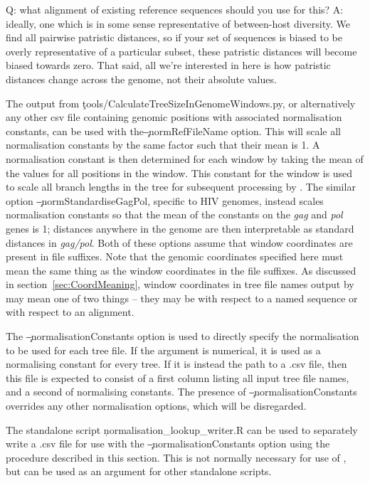 Q: what alignment of existing reference sequences should you use for this?
A: ideally, one which is in some sense representative of between-host diversity.
We find all pairwise patristic distances, so if your set of sequences is biased to be overly representative of a particular subset, these patristic distances will become biased towards zero.
That said, all we're interested in here is how patristic distances change across the genome, not their absolute values.

The output from \c{tools/CalculateTreeSizeInGenomeWindows.py}, or alternatively any other csv file containing genomic positions with associated normalisation constants, can be used with the\break \c{--normRefFileName} option.
This will scale all normalisation constants by the same factor such that their mean is 1.
A normalisation constant is then determined for each window by taking the mean of the values for all positions in the window.
This constant for the window is used to scale all branch lengths in the tree for subsequent processing by \pat.
The similar option \c{--normStandardiseGagPol}, specific to HIV genomes, instead scales normalisation constants so that the mean of the constants on the {\it gag} and {\it pol} genes is 1; distances anywhere in the genome are then interpretable as standard distances in {\it gag/pol}.
Both of these options assume that window coordinates are present in file suffixes.
Note that the genomic coordinates specified here must mean the same thing as the window coordinates in the file suffixes.
As discussed in section~\ref{sec:CoordMeaning}, window coordinates in tree file names output by \pmt may mean one of two things -- they may be with respect to a named sequence or with respect to an alignment.

The \c{--normalisationConstants} option is used to directly specify the normalisation to be used for each tree file.
If the argument is numerical, it is used as a normalising constant for every tree.
If it is instead the path to a .csv file, then this file is expected to consist of a first column listing all input tree file names, and a second of normalising constants.
The presence of \c{--normalisationConstants} overrides any other normalisation options, which will be disregarded.

The standalone script \c{normalisation\_lookup\_writer.R} can be used to separately write a .csv file for use with the \c{--normalisationConstants} option using the procedure described in this section. This is not normally necessary for use of \pat, but can be used as an argument for other standalone scripts.

